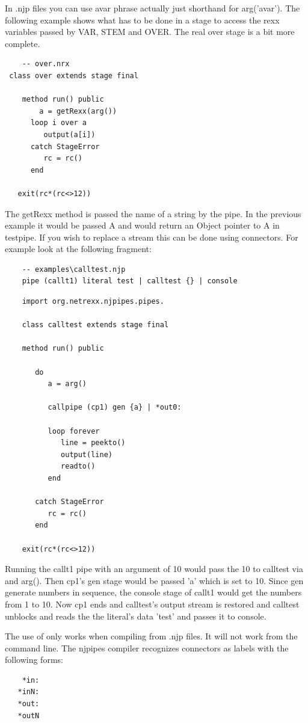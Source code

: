 In .njp files you can use {avar} phrase actually just shorthand for  arg('avar').
The following example shows what has to be done in a stage to access the rexx variables passed by VAR, STEM and OVER.  The real  over stage is a bit more complete.
\begin{lstlisting}
    -- over.nrx
 class over extends stage final

    method run() public
        a = getRexx(arg())
      loop i over a
         output(a[i])
      catch StageError
         rc = rc()
      end
    
   exit(rc*(rc<>12))
\end{lstlisting}
 The getRexx method is passed the name of a string by the pipe.  In the previous example it would be passed A and would return an Object pointer to A in testpipe. If you wish to replace a stream this can be done using connectors.  For example look at the following fragment:
\begin{verbatim}
    -- examples\calltest.njp
    pipe (callt1) literal test | calltest {} | console
\end{verbatim}
\begin{lstlisting}
    import org.netrexx.njpipes.pipes.

    class calltest extends stage final

    method run() public

       do
          a = arg()

          callpipe (cp1) gen {a} | *out0:

          loop forever
             line = peekto()
             output(line)
             readto()
          end

       catch StageError
          rc = rc()
       end

    exit(rc*(rc<>12))
\end{lstlisting}
Running the callt1 pipe with an argument of 10 would pass the 10 to calltest via {} and arg().  Then cp1's gen stage would be passed 'a' which is set to 10.  Since gen generate numbers in sequence, the console stage of callt1 would get the numbers from 1 to 10.  Now cp1 ends and calltest's output stream is restored and calltest unblocks and reads the the literal's data 'test' and passes it to console.

The use of {} only works when compiling from .njp files.  It will not work from the command line.
The njpipes compiler recognizes connectors as labels with the following forms:
\begin{verbatim}
    *in:
   *inN:
   *out:
   *outN
\end{verbatim}

